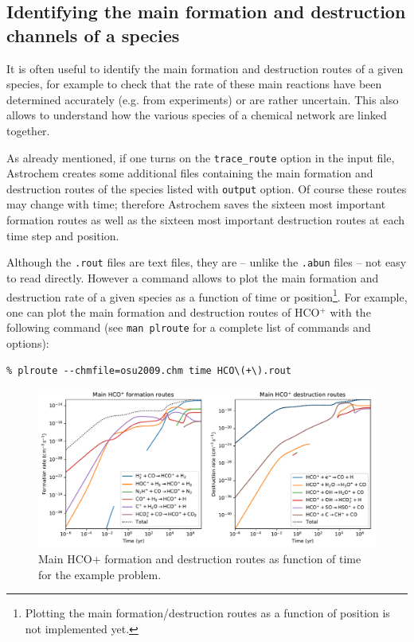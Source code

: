 \documentclass[a4paper,12pt]{article}
\begin{document}
\subsection{Identifying the main formation and destruction channels of
   a species}
\label{sec:ident-main-form}

It is often useful to identify the main formation and destruction
routes of a given species, for example to check that the rate of these
main reactions have been determined accurately (e.g. from experiments)
or are rather uncertain. This also allows to understand how the
various species of a chemical network are linked together.

As already mentioned, if one turns on the \verb=trace_route= option
in the input file, Astrochem creates some additional files containing
the main formation and destruction routes of the species listed with
\verb=output= option. Of course these routes may change with time;
therefore Astrochem saves the sixteen most important formation routes
as well as the sixteen most important destruction routes at each time
step and position.

Although the \verb=.rout= files are text files, they are -- unlike
the \verb=.abun= files -- not easy to read directly. However a command
allows to plot the main formation and destruction rate of a given
species as a function of time or position\footnote{Plotting the main
  formation/destruction routes as a function of position is not
  implemented yet.}. For example, one can plot the main formation and
destruction routes of HCO$^{+}$ with the following command (see
\verb=man plroute= for a complete list of commands and options):

\begin{verbatim}
% plroute --chmfile=osu2009.chm time HCO\(+\).rout
\end{verbatim}

\begin{figure}
  \begin{center}
    \includegraphics[width=\columnwidth]{fig2.pdf}
  \end{center}
  \caption{Main HCO${+}$ formation and destruction routes as function
    of time for the example problem.}
  \label{fig:example-routes}
\end{figure}
\end{document}
